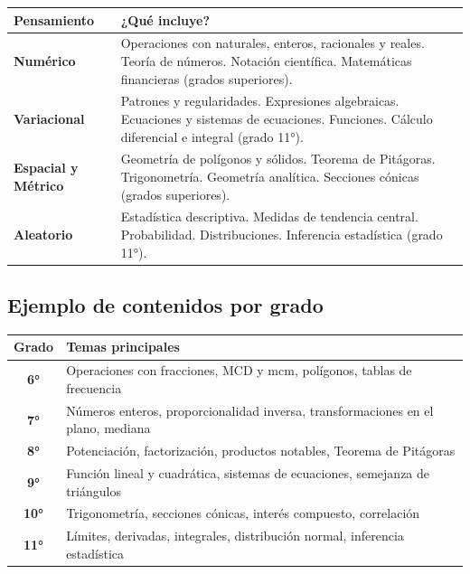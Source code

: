 \documentclass[12pt, a4paper]{article}
\begin{document}
\begin{center}
\begin{tabularx}{0.95\textwidth}{>{\bfseries}l X}
\toprule
\textbf{Pensamiento} & \textbf{¿Qué incluye?} \\
\midrule
\textcolor{ytOrange}{Numérico} & Operaciones con naturales, enteros, racionales y reales. Teoría de números. Notación científica. Matemáticas financieras (grados superiores). \\[5pt]
\textcolor{ytBlue}{Variacional} & Patrones y regularidades. Expresiones algebraicas. Ecuaciones y sistemas de ecuaciones. Funciones. Cálculo diferencial e integral (grado 11°). \\[5pt]
\textcolor{ytGreen}{Espacial y Métrico} & Geometría de polígonos y sólidos. Teorema de Pitágoras. Trigonometría. Geometría analítica. Secciones cónicas (grados superiores). \\[5pt]
\textcolor{ytYellow}{Aleatorio} & Estadística descriptiva. Medidas de tendencia central. Probabilidad. Distribuciones. Inferencia estadística (grado 11°). \\
\bottomrule
\end{tabularx}
\end{center}

\subsection{Ejemplo de contenidos por grado}

\begin{center}
\renewcommand{\arraystretch}{1.3}
\begin{tabularx}{0.95\textwidth}{c X}
\toprule
\textbf{Grado} & \textbf{Temas principales} \\
\midrule
\textbf{6°} & Operaciones con fracciones, MCD y mcm, polígonos, tablas de frecuencia \\
\textbf{7°} & Números enteros, proporcionalidad inversa, transformaciones en el plano, mediana \\
\textbf{8°} & Potenciación, factorización, productos notables, Teorema de Pitágoras \\
\textbf{9°} & Función lineal y cuadrática, sistemas de ecuaciones, semejanza de triángulos \\
\textbf{10°} & Trigonometría, secciones cónicas, interés compuesto, correlación \\
\textbf{11°} & Límites, derivadas, integrales, distribución normal, inferencia estadística \\
\bottomrule
\end{tabularx}
\end{center}
\end{document}
